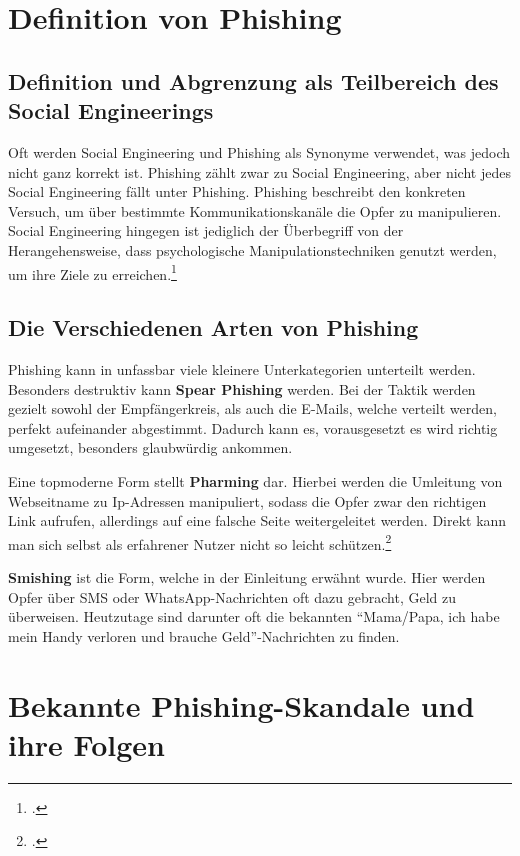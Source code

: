 \documentclass[12pt, a4paper, oneside]{scrartcl}
\begin{document}
\section{Definition von Phishing}

\subsection{Definition und Abgrenzung als Teilbereich des Social Engineerings}
Oft werden Social Engineering und Phishing als Synonyme verwendet, was jedoch nicht ganz korrekt ist.
Phishing zählt zwar zu Social Engineering, aber nicht jedes Social Engineering fällt unter Phishing. 
Phishing beschreibt den konkreten Versuch, um über bestimmte Kommunikationskanäle die Opfer zu manipulieren.
Social Engineering hingegen ist jediglich der Überbegriff von der Herangehensweise, dass psychologische
Manipulationstechniken genutzt werden, um ihre Ziele zu erreichen.\footcite{Keeper_Phishing}

\subsection{Die Verschiedenen Arten von Phishing}
Phishing kann in unfassbar viele kleinere Unterkategorien unterteilt werden. Besonders destruktiv kann
\textbf{Spear Phishing} werden. Bei der Taktik werden gezielt sowohl der Empfängerkreis, als auch die E-Mails,
welche verteilt werden, perfekt aufeinander abgestimmt. Dadurch kann es, vorausgesetzt es wird richtig
umgesetzt, besonders glaubwürdig ankommen.
\par
Eine topmoderne Form stellt \textbf{Pharming} dar. Hierbei werden die Umleitung von Webseitname zu 
Ip-Adressen manipuliert, sodass die Opfer zwar den richtigen Link aufrufen, allerdings auf eine falsche
Seite weitergeleitet werden. Direkt kann man sich selbst als erfahrener Nutzer nicht so leicht schützen.\footcite{Bayern_Phaming}
\par
\textbf{Smishing} ist die Form, welche in der Einleitung erwähnt wurde. Hier werden Opfer über SMS oder
WhatsApp-Nachrichten oft dazu gebracht, Geld zu überweisen. Heutzutage sind darunter oft die bekannten 
``Mama/Papa, ich habe mein Handy verloren und brauche Geld''-Nachrichten zu finden.\\

\section{Bekannte Phishing-Skandale und ihre Folgen}
\end{document}

